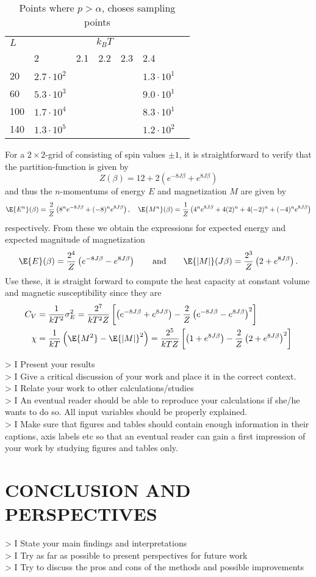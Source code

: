 \documentclass[11pt,english,a4paper]{article}
\begin{document}
\begin{table}
\center
\begin{tabular}{l l l l l l l}
$L$ & \multicolumn{5}{c}{$k_BT$}\\
		&2			&2.1	&2.2	&2.3	&2.4\\
\hline
20  	&$2.7\cdot 10^2$	&				&				&				&$1.3\cdot 10^1$\\
60		&$5.3\cdot 10^3$	&				&				&				&$9.0\cdot 10^1$\\
100		&$1.7\cdot 10^4$	&				&				&				&$8.3\cdot 10^1$\\
140		&$1.3\cdot 10^5$	&				&				&				&$1.2\cdot 10^2$
\end{tabular}
\caption{Points where $p > \alpha$, choses sampling points} \label{tab:samplingpointsm	}
\end{table}

For a $2 \times 2$-grid of consisting of spin values $\pm 1$, it is straightforward to verify that the partition-function is given by
\[
Z(\beta) = 12 + 2\left( e^{ -8 J\beta} + e^{ 8 J\beta} \right)
\]
and thus the $n$-momentums of energy $E$ and magnetization $M$ are given by
\[
\E{E^n}(\beta) = \frac{2}{Z}\left( 8^n e^{ -8 J\beta} + (-8)^n e^{ 8 J\beta}  \right), \quad \E{M^n}(\beta) = \frac{1}{Z}\left( 4^n e^{ 8 J\beta} + 4(2)^n + 4(-2)^n + (-4)^n e^{ 8 J\beta}  \right)
\]
respectively. From these we obtain the expressions for expected energy and expected magnitude of magnetization 
\[
\E{E}(\beta) = \frac{2^4}{Z}\left( e^{ -8 J\beta} - e^{ 8 J\beta}  \right) \qquad \text{and} \qquad \E{|M|}(J\beta) = \frac{2^3}{Z}\left(  2 + e^{ 8 J\beta} \right).
\]
Use these, it is straight forward to compute the heat capacity at constant volume and magnetic susceptibility since they are
\begin{align*}
C_V &= \frac{1}{kT^2}\sigma_E^2 = \frac{2^7}{kT^2Z}\left[  \left( e^{ -8J\beta} + e^{ 8J\beta} \right) - \frac{2}{Z}\left( e^{ -8J\beta} - e^{ 8J\beta} \right)^2  \right] \\
\chi &= \frac{1}{kT} \left(\E{M^2} -\E{|M|}^2 \right) = \frac{2^5}{kTZ} \left[ \left( 1 + e^{ 8J \beta} \right) - \frac{2}{Z}\left( 2 + e^{ 8J \beta} \right)^2 \right]
\end{align*}

> I Present your results\\
> I Give a critical discussion of your work and place it in the correct context.\\
> I Relate your work to other calculations/studies\\
> I An eventual reader should be able to reproduce your calculations if she/he wants to do so. All input variables should be properly explained.\\
> I Make sure that figures and tables should contain enough information in their captions, axis labels etc so that an eventual reader can gain a first impression of your work by studying figures and tables only.
\section*{\uppercase{Conclusion and perspectives}}
> I State your main findings and interpretations\\
> I Try as far as possible to present perspectives for future work\\
> I Try to discuss the pros and cons of the methods and possible improvements

\printbibliography
\end{document}
